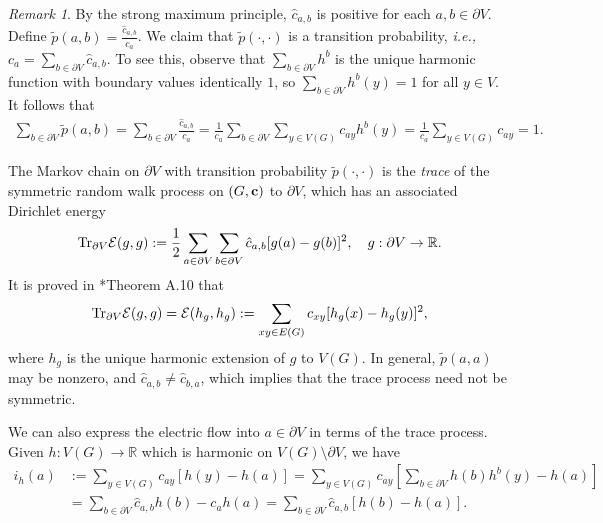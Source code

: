 \documentclass[11pt]{amsart}
\theoremstyle{plain}
\theoremstyle{definition}
\theoremstyle{remark}
\newtheorem{remark}[lemma]{Remark}
\begin{document}

\begin{remark}
\label{rem:trace}
By the strong maximum principle, $\hat{c}_{a,b}$ is positive for each $a,b\in \partial V$. Define $\widetilde{p}(a,b) = \frac{\hat{c}_{a,b}}{c_a}$. We claim that $\widetilde{p}(\cdot,\cdot)$ is a transition probability, \emph{i.e.,} $c_a = \sum_{b\in \partial V} \hat{c}_{a,b}$. To see this, observe that $\sum_{b\in \partial V} h^b$ is the unique harmonic function with boundary values identically $1$, so $\sum_{b\in \partial V} h^b(y) =1$ for all $y\in V$. It follows that 
\begin{align*}
\sum_{b\in \partial V} \widetilde{p}(a,b) = \sum_{b\in \partial V} \frac{\hat{c}_{a,b}}{c_a} = \frac{1}{c_a} \sum_{b\in\partial V} \sum_{y\in V(G)} c_{ay} h^b(y) = \frac{1}{c_a} \sum_{y\in V(G)} c_{ay}= 1.
\end{align*}

The Markov chain on $\partial V$ with transition probability $\widetilde{p}(\cdot,\cdot)$ is the \emph{trace} of the symmetric random walk process on $(G,{\bf c})$ to $\partial V$, which has an associated Dirichlet energy
\begin{align*}
{\rm Tr}_{\partial V} \mathcal{E}(g,g) := \frac{1}{2} \sum_{a\in \partial V} \sum_{b\in \partial V} \hat{c}_{a,b} [g(a)-g(b)]^2, \quad g: \partial V\to\mathbb{R}.
\end{align*}
It is proved in \cite{Ngasket}*{Theorem A.10} that 
\begin{align*}
{\rm Tr}_{\partial V} \mathcal{E}(g,g) = \mathcal{E}(h_g,h_g) := \sum_{xy\in E(G)} c_{xy} [h_g(x)-h_g(y)]^2,
\end{align*}
where $h_g$ is the unique harmonic extension of $g$ to $V(G)$. In general, $\tilde{p}(a,a)$ may be nonzero, and $\hat{c}_{a,b} \neq \hat{c}_{b,a}$, which implies that the trace process need not be symmetric.

We can also express the electric flow into $a\in \partial V$ in terms of the trace process. Given $h: V(G)\to \mathbb{R}$ which is harmonic on $V(G)\setminus \partial V$, we have
\begin{align*}
i_h(a) &:=\sum_{y\in V(G)} c_{ay}[h(y)-h(a)] = \sum_{y\in V(G)} c_{ay} \left[\sum_{b\in \partial V} h(b) h^b(y)- h(a)\right]\\
\nonumber &= \sum_{b\in \partial V} \hat{c}_{a,b} h(b) - c_a h(a) = \sum_{b\in \partial V} \hat{c}_{a,b} [h(b)-h(a)].
\end{align*} 
\end{remark}
\end{document}
